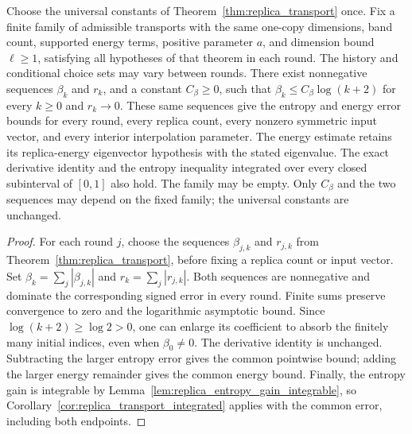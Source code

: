 \begin{theorem}
    \label{thm:replica_transport_finite_family}
    \leanok
    Choose the universal constants of Theorem~\ref{thm:replica_transport} once.
    Fix a finite family of admissible transports with the same one-copy dimensions,
    band count, supported energy terms, positive parameter $a$, and dimension bound
    $\ell\ge1$, satisfying all hypotheses of that theorem in each round.
    The history and conditional choice sets may vary between rounds.
    There exist nonnegative sequences $\beta_k$ and $r_k$, and a constant
    $C_\beta\ge0$, such that $\beta_k\le C_\beta\log(k+2)$ for every $k\ge0$
    and $r_k\longrightarrow0$.
    These same sequences give the entropy and energy error bounds for every round,
    every replica count, every nonzero symmetric input vector, and every interior
    interpolation parameter. The energy estimate retains its replica-energy
    eigenvector hypothesis with the stated eigenvalue. The exact derivative identity
    and the entropy inequality integrated over every closed subinterval of $[0,1]$
    also hold. The family may be empty. Only $C_\beta$ and the two sequences may
    depend on the fixed family; the universal constants are unchanged.
\end{theorem}

\begin{proof}\leanok
    For each round $j$, choose the sequences $\beta_{j,k}$ and $r_{j,k}$ from
    Theorem~\ref{thm:replica_transport}, before fixing a replica count or input vector.
    Set $\beta_k=\sum_j|\beta_{j,k}|$ and $r_k=\sum_j|r_{j,k}|$.
    Both sequences are nonnegative and dominate the corresponding signed error
    in every round. Finite sums preserve convergence to zero and the logarithmic
    asymptotic bound. Since $\log(k+2)\ge\log2>0$, one can enlarge its coefficient
    to absorb the finitely many initial indices, even when $\beta_0\ne0$.
    The derivative identity is unchanged. Subtracting the larger entropy error
    gives the common pointwise bound; adding the larger energy remainder gives
    the common energy bound. Finally, the entropy gain is integrable by
    Lemma~\ref{lem:replica_entropy_gain_integrable}, so
    Corollary~\ref{cor:replica_transport_integrated} applies with the common error,
    including both endpoints.
\end{proof}
